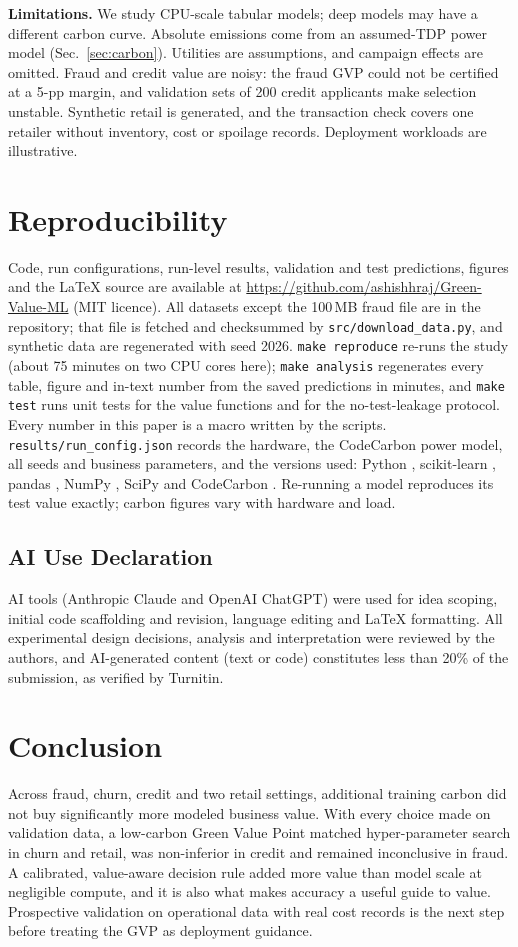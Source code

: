 \documentclass[conference]{IEEEtran}
\newcommand{\RepoURL}{\url{https://github.com/ashishhraj/Green-Value-ML}}
\begin{document}
\textbf{Limitations.} We study CPU-scale tabular models; deep models may have a different carbon curve. Absolute
emissions come from an assumed-TDP power model (Sec.~\ref{sec:carbon}). Utilities are assumptions, and campaign effects
are omitted. Fraud and credit value are noisy: the fraud GVP could not be certified at a 5-pp margin, and validation sets
of 200 credit applicants make selection unstable. Synthetic retail is generated, and the transaction check covers one
retailer without inventory, cost or spoilage records. Deployment workloads are illustrative.

\section{Reproducibility}
Code, run configurations, run-level results, validation and test predictions, figures and the LaTeX source are
available at \RepoURL{} (MIT licence). All datasets except the 100\,MB fraud file are in the repository; that file is
fetched and checksummed by \texttt{src/download\_data.py}, and synthetic data are regenerated with seed 2026.
\texttt{make reproduce} re-runs the study (about 75 minutes on two CPU cores here); \texttt{make analysis} regenerates
every table, figure and in-text number from the saved predictions in minutes, and \texttt{make test} runs unit tests for
the value functions and for the no-test-leakage protocol. Every number in this paper is a macro written by the scripts.
\texttt{results/run\_config.json} records the hardware, the CodeCarbon power model, all seeds and business parameters,
and the versions used: Python \PyVer, scikit-learn \VerScikitLearn, pandas \VerPandas, NumPy \VerNumpy, SciPy
\VerScipy{} and CodeCarbon \VerCodecarbon. Re-running a model reproduces its test value exactly; carbon figures vary
with hardware and load.

\subsection{AI Use Declaration}
AI tools (Anthropic Claude and OpenAI ChatGPT) were used for idea scoping, initial code scaffolding and revision,
language editing and LaTeX formatting. All experimental design decisions, analysis and interpretation were reviewed by
the authors, and AI-generated content (text or code) constitutes less than 20\% of the submission, as verified by
Turnitin.

\section{Conclusion}
Across fraud, churn, credit and two retail settings, additional training carbon did not buy significantly more modeled
business value. With every choice made on validation data, a low-carbon Green Value Point matched hyper-parameter search
in churn and retail, was non-inferior in credit and remained inconclusive in fraud. A calibrated, value-aware decision
rule added more value than model scale at negligible compute, and it is also what makes accuracy a useful guide to
value. Prospective validation on operational data with real cost records is the next step before treating the GVP as
deployment guidance.
\end{document}
